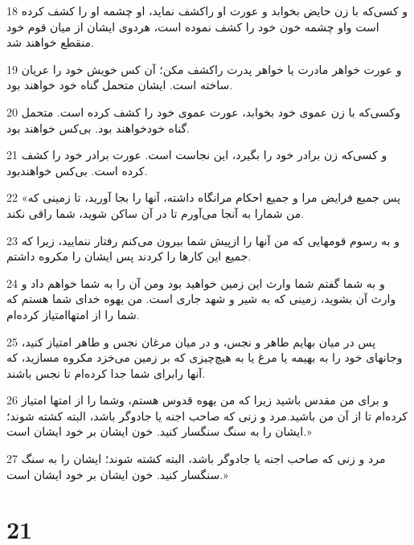 \par 18 و کسی‌که با زن حایض بخوابد و عورت او راکشف نماید، او چشمه او را کشف کرده است واو چشمه خون خود را کشف نموده است، هردوی ایشان از میان قوم خود منقطع خواهند شد.
\par 19 و عورت خواهر مادرت یا خواهر پدرت راکشف مکن؛ آن کس خویش خود را عریان ساخته است. ایشان متحمل گناه خود خواهند بود.
\par 20 وکسی‌که با زن عموی خود بخوابد، عورت عموی خود را کشف کرده است. متحمل گناه خودخواهند بود. بی‌کس خواهند بود.
\par 21 و کسی‌که زن برادر خود را بگیرد، این نجاست است. عورت برادر خود را کشف کرده است. بی‌کس خواهندبود.
\par 22 «پس جمیع فرایض مرا و جمیع احکام مرانگاه داشته، آنها را بجا آورید، تا زمینی که من شمارا به آنجا می‌آورم تا در آن ساکن شوید، شما راقی نکند.
\par 23 و به رسوم قومهایی که من آنها را ازپیش شما بیرون می‌کنم رفتار ننمایید، زیرا که جمیع این کارها را کردند پس ایشان را مکروه داشتم.
\par 24 و به شما گفتم شما وارث این زمین خواهید بود ومن آن را به شما خواهم داد و وارث آن بشوید، زمینی که به شیر و شهد جاری است. من یهوه خدای شما هستم که شما را از امتهاامتیاز کرده‌ام.
\par 25 پس در میان بهایم طاهر و نجس، و در میان مرغان نجس و طاهر امتیاز کنید، وجانهای خود را به بهیمه یا مرغ یا به هیچ‌چیزی که بر زمین می‌خزد مکروه مسازید، که آنها رابرای شما جدا کرده‌ام تا نجس باشند.
\par 26 و برای من مقدس باشید زیرا که من یهوه قدوس هستم، وشما را از امتها امتیاز کرده‌ام تا از آن من باشید.مرد و زنی که صاحب اجنه یا جادوگر باشد، البته کشته شوند؛ ایشان را به سنگ سنگسار کنید. خون ایشان بر خود ایشان است.»
\par 27 مرد و زنی که صاحب اجنه یا جادوگر باشد، البته کشته شوند؛ ایشان را به سنگ سنگسار کنید. خون ایشان بر خود ایشان است.» 
 
\chapter{21}

